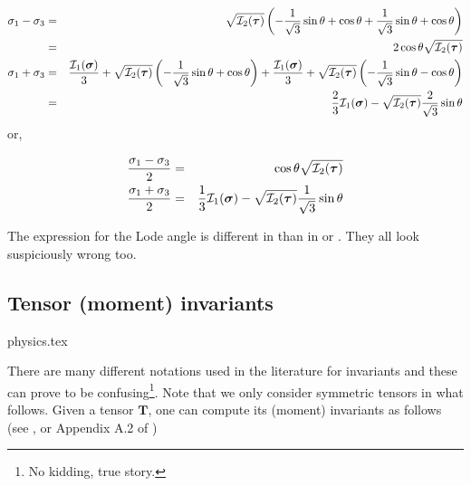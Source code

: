 \begin{eqnarray}
\sigma_1 -\sigma_3
&=&  \sqrt{{\cal I}_2({\bm \tau})} \left( 
-\frac{1}{\sqrt{3}}\sin \theta  + \cos \theta 
+\frac{1}{\sqrt{3}}\sin \theta  + \cos \theta \right) \nonumber\\
&=& 2 \cos \theta \sqrt{{\cal I}_2({\bm \tau})} \\ 
\sigma_1 + \sigma_3 
&=&   
\frac{{\cal I}_1({\bm \sigma})}{3} + \sqrt{{\cal I}_2({\bm \tau})} \left(-\frac{1}{\sqrt{3}}\sin \theta  + \cos \theta \right)   
+\frac{{\cal I}_1({\bm \sigma})}{3} + \sqrt{{\cal I}_2({\bm \tau})} \left(-\frac{1}{\sqrt{3}}\sin \theta  - \cos \theta \right)   
 \nonumber\\
&=& 
\frac{2}{3} {\cal I}_1({\bm \sigma}) -\sqrt{ {\cal I}_2({\bm \tau})} \frac{2}{\sqrt{3}}\sin \theta 
\end{eqnarray}
or, 
\begin{mdframed}[backgroundcolor=blue!5]
\begin{eqnarray}
\frac{\sigma_1 -\sigma_3}{2} &=&  \cos \theta \sqrt{{\cal I}_2({\bm \tau})}  \label{eq:sig13a} \\
\frac{\sigma_1 + \sigma_3}{2} &=& \frac{1}{3} {\cal I}_1({\bm \sigma}) -\sqrt{{\cal I}_2({\bm \tau})} \frac{1}{\sqrt{3}}\sin \theta \label{eq:sig13b}
\end{eqnarray}
\end{mdframed}



\begin{remark}
The expression for the Lode angle is different in \cite[p101]{book_zitf} than in \cite{zico74} or \cite[p62]{zita2}. They all look suspiciously wrong too.
\end{remark}


\subsection{Tensor (moment) invariants}\label{sec:invariants}
\begin{flushright} {\tiny {\color{gray} physics.tex}} \end{flushright}


There are many different notations used in the literature for invariants 
and these can prove to be 
confusing\footnote{No kidding, true story.}. Note that we only consider symmetric tensors in what follows.
Given a tensor $\bm{T}$,  one can compute its (moment) invariants as follows 
(see \cite[p.339]{reddybook2}, or Appendix A.2 of \cite{zita2})

